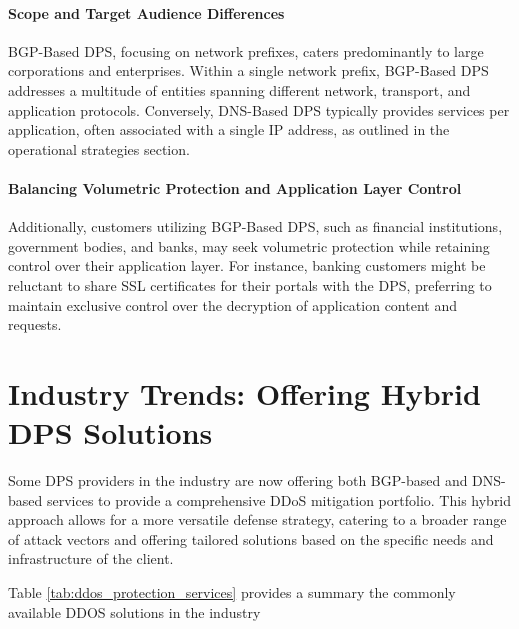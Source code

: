 \paragraph{Scope and Target Audience Differences} BGP-Based DPS, focusing on network prefixes, caters predominantly to large corporations and enterprises. Within a single network prefix, BGP-Based DPS addresses a multitude of entities spanning different network, transport, and application protocols. Conversely, DNS-Based DPS typically provides services per application, often associated with a single IP address, as outlined in the operational strategies section. 

\paragraph{Balancing Volumetric Protection and Application Layer Control} Additionally, customers utilizing BGP-Based DPS, such as financial institutions, government bodies, and banks, may seek volumetric protection while retaining control over their application layer. For instance, banking customers might be reluctant to share SSL certificates for their portals with the DPS, preferring to maintain exclusive control over the decryption of application content and requests.
\section{Industry Trends: Offering Hybrid DPS Solutions}\label{sec:solutions}
Some DPS providers in the industry are now offering both BGP-based and DNS-based services to provide a comprehensive DDoS mitigation portfolio. This hybrid approach allows for a more versatile defense strategy, catering to a broader range of attack vectors and offering tailored solutions based on the specific needs and infrastructure of the client.

Table \ref{tab:ddos_protection_services} provides a summary the commonly available DDOS solutions in the industry

